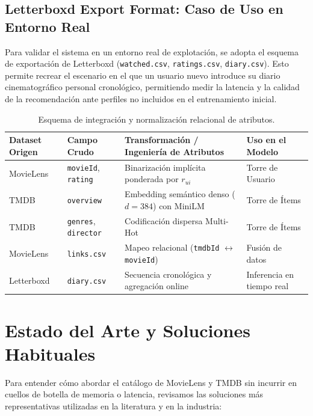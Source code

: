 \documentclass[a4paper,11pt]{article}
\begin{document}
\subsection{Letterboxd Export Format: Caso de Uso en Entorno Real}
Para validar el sistema en un entorno real de explotación, se adopta el esquema de exportación de Letterboxd (\texttt{watched.csv}, \texttt{ratings.csv}, \texttt{diary.csv}). Esto permite recrear el escenario en el que un usuario nuevo introduce su diario cinematográfico personal cronológico, permitiendo medir la latencia y la calidad de la recomendación ante perfiles no incluidos en el entrenamiento inicial.

\begin{table}[!htbp]
    \centering
    \small
    \setlength{\tabcolsep}{5pt}
    \caption{Esquema de integración y normalización relacional de atributos.}
    \label{tab:pipeline_datos}
    \begin{tabularx}{\textwidth}{p{2.5cm} p{2.8cm} X p{3.0cm}}
        \toprule
        \textbf{Dataset Origen} & \textbf{Campo Crudo} & \textbf{Transformación / Ingeniería de Atributos} & \textbf{Uso en el Modelo} \\ 
        \midrule
        MovieLens & \texttt{movieId}, \texttt{rating} & Binarización implícita ponderada por $r_{ui}$ & Torre de Usuario \\
        TMDB & \texttt{overview} & Embedding semántico denso ($d=384$) con MiniLM & Torre de Ítems \\
        TMDB & \texttt{genres}, \texttt{director} & Codificación dispersa Multi-Hot & Torre de Ítems \\
        MovieLens & \texttt{links.csv} & Mapeo relacional (\texttt{tmdbId} $\leftrightarrow$ \texttt{movieId}) & Fusión de datos \\
        Letterboxd & \texttt{diary.csv} & Secuencia cronológica y agregación online & Inferencia en tiempo real \\
        \bottomrule
    \end{tabularx}
\end{table}

\section{Estado del Arte y Soluciones Habituales}

Para entender cómo abordar el catálogo de MovieLens y TMDB sin incurrir en cuellos de botella de memoria o latencia, revisamos las soluciones más representativas utilizadas en la literatura y en la industria:
\end{document}
